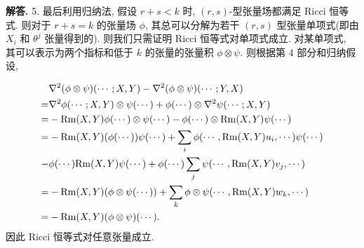 \documentclass{ctexart}
\newenvironment{solution}{\par\noindent\textbf{解答. }}{\par}
\begin{document}
\begin{solution}
    5. 最后利用归纳法, 假设 $r + s < k$ 时, $(r, s)$-型张量场都满足 Ricci 恒等式. 则对于 $r + s = k$ 的张量场 $\phi$, 其总可以分解为若干 $(r, s)$ 型张量单项式(即由 $X_i$ 和 $\theta^j$ 张量得到的). 则我们只需证明 Ricci 恒等式对单项式成立. 对某单项式, 其可以表示为两个指标和低于 $k$ 的张量的张量积 $\phi \otimes \psi$. 则根据第 4 部分和归纳假设,
    
    \[
        \begin{aligned}
         & \nabla^{2}(\phi \otimes \psi)(\cdots; X, Y) - \nabla^{2}(\phi \otimes \psi)(\cdots; Y, X) \\
        =& \nabla^2\phi(\cdots; X, Y) \otimes \psi(\cdots) + \phi(\cdots) \otimes \nabla^2\psi(\cdots; X, Y) \\
        =& -\mathrm{Rm}(X, Y)\phi(\cdots) \otimes \psi(\cdots) - \phi(\cdots) \otimes \mathrm{Rm}(X, Y)\psi(\cdots) \\
        =& -\mathrm{Rm}(X, Y)(\phi(\cdots))\psi(\cdots) + \sum_{i}\phi(\cdots, \mathrm{Rm}(X, Y)u_i, \cdots)\psi(\cdots) \\
        -& \phi(\cdots)\mathrm{Rm}(X, Y)\psi(\cdots) + \phi(\cdots)\sum_{j}\psi(\cdots, \mathrm{Rm}(X, Y)v_j, \cdots) \\
        =& -\mathrm{Rm}(X, Y)(\phi \otimes \psi(\cdots)) + \sum_{k}\phi \otimes \psi(\cdots, \mathrm{Rm}(X, Y)w_k, \cdots) \\
        =& -\mathrm{Rm}(X, Y)(\phi \otimes \psi)(\cdots).
        \end{aligned}
    \]
    因此 Ricci 恒等式对任意张量成立.
\end{solution}
\end{document}
